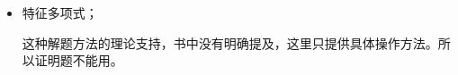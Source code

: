 \documentclass{article}
\begin{document}
\begin{itemize}
\begin{itemize}
\begin{align*}
                  2 z_1^2 - 2 z_2^2 + 8 z_2 z_3 - 2 z_3^2
                \end{align*}
                $z_2^2$的系数不为零，对$z_2$配方，得
                \begin{align*}
                   & 2 z_1^2 - 2 z_2^2 + 8 z_2 z_3 - 2 z_3^2             \\
                   & = 2 z_1^2 - 2 (z_2^2 - 2 \cdot 2 z_2 z_3) - 2 z_3^2 \\
                   & = 2 z_1^2 - 2 (z_2 - 2 z_3)^2 + 8 z_3^2 - 2 z_3^2   \\
                   & = 2 z_1^2 - 2 (z_2 - 2 z_3)^2 + 6 z_3^2
                \end{align*}
                做变数替换
                \begin{equation*}
                  \begin{cases*}
                    w_1 = z_1         \\
                    w_2 = z_2 - 2 z_3 \\
                    w_3 = z_3
                  \end{cases*}
                \end{equation*}
                二次型化作
                \begin{align*}
                  2 w_1^2 - 2 w_2^2 + 6 w_3^2
                \end{align*}
                故，$f$的秩为3，正惯性指数为2， 负惯性指数为1，符号差为1，规范型为
                \begin{align*}
                  u_1^2 + u_2^2 - u_3^2
                \end{align*}

          \item 特征多项式；

                这种解题方法的理论支持，书中没有明确提及，这里只提供具体操作方法。所以证明题不能用。


\end{itemize}
\end{itemize}
\end{document}
